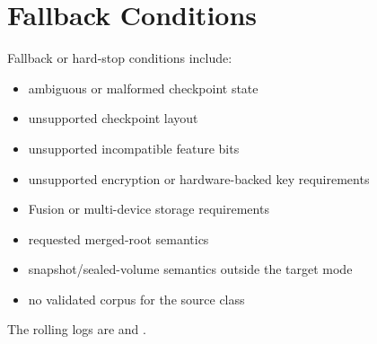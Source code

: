 \section{Fallback Conditions}

Fallback or hard-stop conditions include:

\begin{itemize}
  \item ambiguous or malformed checkpoint state
  \item unsupported checkpoint layout
  \item unsupported incompatible feature bits
  \item unsupported encryption or hardware-backed key requirements
  \item Fusion or multi-device storage requirements
  \item requested merged-root semantics
  \item snapshot/sealed-volume semantics outside the target mode
  \item no validated corpus for the source class
\end{itemize}

The rolling logs are 
and .
